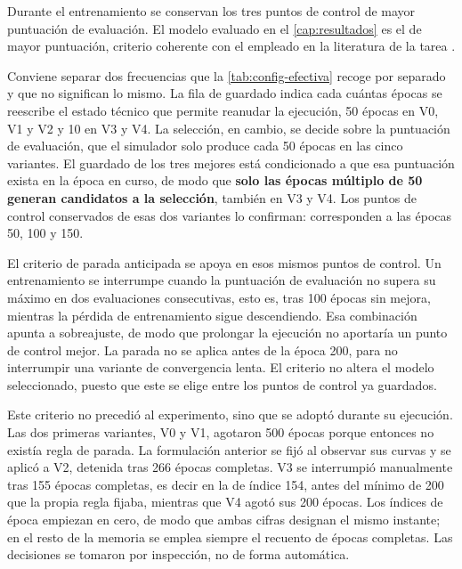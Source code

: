 Durante el entrenamiento se conservan los tres puntos de control de mayor puntuaci\'on de
evaluaci\'on. El modelo evaluado en el \cref{cap:resultados} es el de mayor puntuaci\'on,
criterio coherente con el empleado en la literatura de la tarea
\cite{mandlekar2021robomimic}.

Conviene separar dos frecuencias que la \cref{tab:config-efectiva} recoge por separado y que
no significan lo mismo. La fila de guardado indica cada cu\'antas \'epocas se reescribe el
estado t\'ecnico que permite reanudar la ejecuci\'on, \num{50} \'epocas en V0, V1 y V2 y
\num{10} en V3 y V4. La selecci\'on, en cambio, se decide sobre la puntuaci\'on de
evaluaci\'on, que el simulador solo produce cada \num{50} \'epocas en las cinco variantes. El
guardado de los tres mejores est\'a condicionado a que esa puntuaci\'on exista en la \'epoca
en curso, de modo que \textbf{solo las \'epocas m\'ultiplo de \num{50} generan candidatos a
la selecci\'on}, tambi\'en en V3 y V4. Los puntos de control conservados de esas dos
variantes lo confirman: corresponden a las \'epocas \num{50}, \num{100} y \num{150}.

El criterio de parada anticipada se apoya en esos mismos puntos de control. Un
entrenamiento se interrumpe cuando la puntuaci\'on de evaluaci\'on no supera su m\'aximo en
dos evaluaciones consecutivas, esto es, tras \num{100} \'epocas sin mejora, mientras la
p\'erdida de entrenamiento sigue descendiendo. Esa combinaci\'on apunta a sobreajuste, de
modo que prolongar la ejecuci\'on no aportar\'ia un punto de control mejor. La parada no se
aplica antes de la \'epoca \num{200}, para no interrumpir una variante de convergencia
lenta. El criterio no altera el modelo seleccionado, puesto que este se elige entre los
puntos de control ya guardados.

Este criterio no precedi\'o al experimento, sino que se adopt\'o durante su ejecuci\'on. Las
dos primeras variantes, V0 y V1, agotaron \num{500} \'epocas porque entonces no exist\'ia
regla de parada. La formulaci\'on anterior se fij\'o al observar sus curvas y se aplic\'o a
V2, detenida tras \num{266} \'epocas completas. V3 se interrumpi\'o manualmente tras
\num{155} \'epocas completas, es decir en la de \'indice \num{154}, antes del m\'inimo de
\num{200} que la propia regla fijaba, mientras que V4 agot\'o sus \num{200} \'epocas. Los
\'indices de \'epoca empiezan en cero, de modo que ambas cifras designan el mismo
instante; en el resto de la memoria se emplea siempre el recuento de \'epocas completas. Las decisiones se tomaron por inspecci\'on, no de forma autom\'atica.

